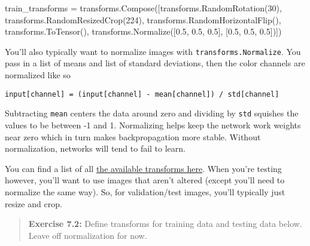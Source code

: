 \documentclass[11pt]{article}
\newenvironment{Shaded}{}{}
\newcommand{\DecValTok}[1]{\textcolor[rgb]{0.25,0.63,0.44}{{#1}}}
\newcommand{\FloatTok}[1]{\textcolor[rgb]{0.25,0.63,0.44}{{#1}}}
\newcommand{\NormalTok}[1]{{#1}}
\newcommand{\OperatorTok}[1]{\textcolor[rgb]{0.40,0.40,0.40}{{#1}}}
\begin{document}
\begin{Shaded}
\begin{Highlighting}[]
\NormalTok{train_transforms }\OperatorTok{=}\NormalTok{ transforms.Compose([transforms.RandomRotation(}\DecValTok{30}\NormalTok{),}
\NormalTok{                                       transforms.RandomResizedCrop(}\DecValTok{224}\NormalTok{),}
\NormalTok{                                       transforms.RandomHorizontalFlip(),}
\NormalTok{                                       transforms.ToTensor(),}
\NormalTok{                                       transforms.Normalize([}\FloatTok{0.5}\NormalTok{, }\FloatTok{0.5}\NormalTok{, }\FloatTok{0.5}\NormalTok{], }
\NormalTok{                                                            [}\FloatTok{0.5}\NormalTok{, }\FloatTok{0.5}\NormalTok{, }\FloatTok{0.5}\NormalTok{])])}
\end{Highlighting}
\end{Shaded}

You'll also typically want to normalize images with
\texttt{transforms.Normalize}. You pass in a list of means and list of
standard deviations, then the color channels are normalized like so

\texttt{input{[}channel{]}\ =\ (input{[}channel{]}\ -\ mean{[}channel{]})\ /\ std{[}channel{]}}

Subtracting \texttt{mean} centers the data around zero and dividing by
\texttt{std} squishes the values to be between -1 and 1. Normalizing
helps keep the network work weights near zero which in turn makes
backpropagation more stable. Without normalization, networks will tend
to fail to learn.

You can find a list of all
\href{http://pytorch.org/docs/0.3.0/torchvision/transforms.html}{the
available transforms here}. When you're testing however, you'll want to
use images that aren't altered (except you'll need to normalize the same
way). So, for validation/test images, you'll typically just resize and
crop.

\begin{quote}
\textbf{Exercise 7.2:} Define transforms for training data and testing
data below. Leave off normalization for now.
\end{quote}
\end{document}
